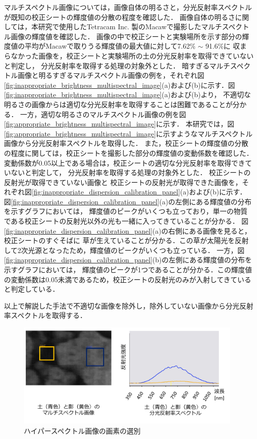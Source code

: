 マルチスペクトル画像については，画像自体の明るさと，分光反射率スペクトルが既知の校正シートの輝度値の分散の程度を確認した．
画像自体の明るさに関しては，本研究で使用したTetracam Inc. 製のMacawで撮影したマルチスペクトル画像の輝度値を確認した．
画像の中で校正シートと実験場所を示す部分の輝度値の平均がMacawで取りうる輝度値の最大値に対して7.62\% $\sim$ 91.6\%に
収まらなかった画像を，校正シートと実験場所の土の分光反射率を取得できていないと判定し，
分光反射率を取得する処理の対象外とした．
暗すぎるマルチスペクトル画像と明るすぎるマルチスペクトル画像の例を，それぞれ図\ref{fig:inappropriate_brightness_multispectral_image}(a)および(b)に示す．図\ref{fig:inappropriate_brightness_multispectral_image}(a)および(b)より，
不適切な明るさの画像からは適切な分光反射率を取得することは困難であることが分かる．
一方，適切な明るさのマルチスペクトル画像の例を図\ref{fig:appropriate_brightness_multispectral_image}に示す．
本研究では，図\ref{fig:appropriate_brightness_multispectral_image}に示すようなマルチスペクトル画像から分光反射率スペクトルを取得した．
また，校正シートの輝度値の分散の程度に関しては，校正シートを撮影した部分の輝度値の変動係数を確認した．
変動係数が0.05以上である場合は，校正シートの適切な分光反射率を取得できていないと判定して，
分光反射率を取得する処理の対象外とした．
校正シートの反射光が取得できていない画像と
校正シートの反射光が取得できた画像を，それぞれ図\ref{fig:inappropriate_dispersion_calibration_panel}(a)および(b)に示す．
図\ref{fig:inappropriate_dispersion_calibration_panel}(a)の左側にある輝度値の分布を示すグラフにおいては，
輝度値のピークがいくつも立っており，単一の物質である校正シートの反射光以外の光も一緒に入ってきていることが分かる．
図\ref{fig:inappropriate_dispersion_calibration_panel}(a)の右側にある画像を見ると，校正シートのすぐそばに
草が生えていることが分かる．この草が太陽光を反射して2次光源となったため，輝度値のピークがいくつも立っている．
一方，図\ref{fig:inappropriate_dispersion_calibration_panel}(b)の左側にある輝度値の分布を示すグラフにおいては，
輝度値のピークが1つであることが分かる．この輝度値の変動係数は0.05未満であるため，校正シートの反射光のみが入射してきていると判定している．

以上で解説した手法で不適切な画像を除外し，除外していない画像から分光反射率スペクトルを取得する．

\begin{figure}[b]
      \begin{center}
            \includegraphics[width=11cm]{./Ch5_ConeIndexEstimation/Fig/hyperspectral_image_selection_compressed.pdf}
            \caption{ハイパースペクトル画像の画素の選別}
            \label{fig:hyperspectral_image_selection}
      \end{center}
\end{figure}

